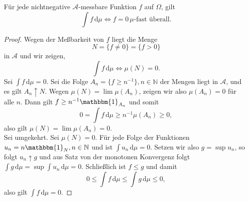 \documentclass[/Users/zhangwusheng/Documents/satz von radon nikodym/satz von radon nikodym.tex]{subfiles}
\begin{document}
    \begin{lemma}\label{lem:6}
        Für jede nichtnegative $\mathcal{A}$-messbare Funktion $f$ auf $\Omega$, gilt 
        \[\int f\,\mathrm{d}\mu \Longleftrightarrow f=0\, \text{$\mu$-fast überall}.\]
    \end{lemma}

    \begin{proof}
        Wegen der Meßbarkeit von $f$ liegt die Menge 
        \[N = \{f \neq 0\} = \{f > 0\}\]
        in $\mathcal{A}$ und wir zeigen, 
        \[\int f\,\mathrm{d}\mu \Longleftrightarrow \mu(N)=0.\]
        Sei $\int f\,\mathrm{d}\mu = 0$. Sei die Folge $A_n = \{f \geq n^{-1}\}, n \in \mathbb{N}$ der Mengen liegt in $\mathcal{A}$,
        und es gilt $A_n \uparrow N$. Wegen $\mu(N) = \lim \mu(A_n)$, zeigen wir also $\mu(A_n) =0$ für alle $n$. Dann gilt $f \geq n^{-1} \mathbbm{1}_{A_n}$
        und somit 
        \[0 = \int f\,\mathrm{d}\mu \geq n^{-1}\mu(A_n) \geq 0,\]
        also gilt $\mu(N) =\lim \mu(A_n) =0$.\\
        Sei umgekehrt. Sei $\mu(N)=0$. Für jede Folge der Funktionen $u_n = n \mathbbm{1}_N, n \in \mathbb{N}$ und ist $\int u_n\,\mathrm{d}\mu =0$.
        Setzen wir also $g = \sup{u_n}$, so folgt $u_n \uparrow g$ und aus Satz von der monotonen Konvergenz folgt 
        $\int g\,\mathrm{d}\mu = \sup \int u_n\,\mathrm{d}\mu=0$. Schließlich ist $f \leq g$ und damit 
        \[0 \leq \int f\,\mathrm{d}\mu \leq \int g\,\mathrm{d}\mu \leq 0,\]
        also gilt $\int f\,\mathrm{d}\mu = 0$.  
    \end{proof}
\end{document}
